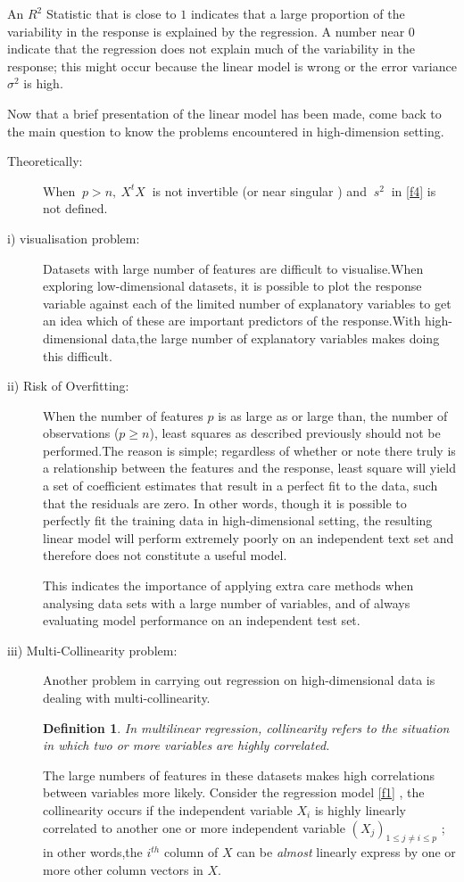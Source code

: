 \documentclass[12pt]{report}
\renewcommand{\emph}{\textit}
\newtheorem {definition}{Definition}[section] %
\begin{document}
\begin{description}
		An $R^{2}$ Statistic that is close to $1$ indicates that a large proportion of the variability in the response is explained by the regression. A number near $0$ indicate that the regression does not explain much of the variability in the response; this might occur because the linear model is wrong or the error variance $\sigma^{2}$ is high.
	\end{description}
	Now that a brief presentation of the linear model has been made, come back to the main question to know the problems encountered in high-dimension setting.
	\begin{description}
		\item[Theoretically:] When $\ p>n,\ X^{t}X\ $ is not invertible (or near singular ) and $\ s^{2}\ $ in \eqref{f4} is not defined.
		\item[i) visualisation problem:] Datasets with large number of features are difficult to visualise.When exploring low-dimensional datasets, it is possible to plot the response variable against each of the limited number of explanatory variables to get an idea which of these are important predictors of the response.With high-dimensional data,the large number of explanatory variables makes doing this difficult.
		\item[ ii) Risk of Overfitting:] When the number of features $p$ is as large as or large than, the number of observations ($p\geq n$), least squares as described previously should not be performed.The reason is simple; regardless of whether or note there truly is a relationship between the features and the response, least square will yield a set of coefficient estimates that result in a perfect fit to the data, such that the residuals are zero.
		In other words, though it is possible to perfectly fit the training data in high-dimensional setting, the resulting linear model will perform extremely poorly on an independent text set and therefore does not constitute a useful model.
		
		This indicates the importance of applying extra care methods when analysing data sets with a large number of variables, and of always evaluating model performance on an independent test set.
		\item[iii) Multi-Collinearity problem:] Another problem in carrying out regression on high-dimensional data is dealing with multi-collinearity. \label{mcp}
		\begin{definition}
			In multilinear regression, collinearity refers to the situation in which two or more variables are highly correlated.
		\end{definition}
		The large numbers of features in these datasets makes high correlations between variables more likely. Consider the regression model \eqref{f1} , the collinearity occurs if the independent variable $X_{i}$ is highly linearly correlated to another one or more independent variable $(X_{j})_{1\leq j\neq i \leq p}$ ; in other words,the $i^{th}$ column of $X$ can be \emph{almost} linearly express by one or more other  column vectors in $X$.
		

\end{description}
\end{document}
